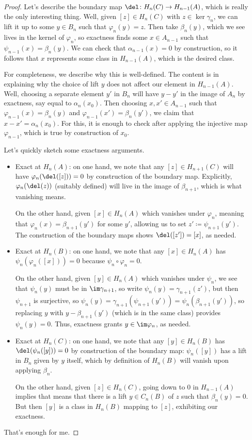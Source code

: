 \documentclass[../notes.tex]{subfiles}
\begin{document}
\begin{proof}
	Let's describe the boundary map $\del\colon H_n(C)\to H_{n-1}(A)$, which is really the only interesting thing. Well, given $[z]\in H_n(C)$ with $z\in\ker\gamma_n$, we can lift it up to some $y\in B_n$ such that $\varphi_n(y)=z$. Then take $\beta_n(y)$, which we see lives in the kernel of $\varphi_n$, so exactness finds some $x\in A_{n-1}$ such that $\psi_{n-1}(x)=\beta_n(y)$. We can check that $\alpha_{n-1}(x)=0$ by construction, so it follows that $x$ represents some class in $H_{n-1}(A)$, which is the desired class.

	For completeness, we describe why this is well-defined. The content is in explaining why the choice of lift $y$ does not affect our element in $H_{n-1}(A)$. Well, choosing a separate element $y'$ in $B_n$ will have $y-y'$ in the image of $A_n$ by exactness, say equal to $\alpha_n(x_0)$. Then choosing $x,x'\in A_{n-1}$ such that $\varphi_{n-1}(x)=\beta_n(y)$ and $\varphi_{n-1}(x')=\beta_n(y')$, we claim that $x-x'=\alpha_n(x_0)$. For this, it is enough to check after applying the injective map $\varphi_{n-1}$, which is true by construction of $x_0$.

	Let's quickly sketch some exactness arguments.
	\begin{itemize}
		\item Exact at $H_n(A)$: on one hand, we note that any $[z]\in H_{n+1}(C)$ will have $\varphi_n(\del([z]))=0$ by construction of the boundary map. Explicitly, $\varphi_n(\del(z))$ (suitably defined) will live in the image of $\beta_{n+1}$, which is what vanishing means.
		
		On the other hand, given $[x]\in H_n(A)$ which vanishes under $\varphi_n$, meaning that $\varphi_n(x)=\beta_{n+1}(y')$ for some $y'$, allowing us to set $z'\coloneqq\psi_{n+1}(y')$. The construction of the boundary maps shows $\del([z'])=[x]$, as needed.

		\item Exact at $H_n(B)$: on one hand, we note that any $[x]\in H_n(A)$ has $\psi_n(\varphi_n([x]))=0$ because $\psi_n\circ\varphi_n=0$.
		
		On the other hand, given $[y]\in H_n(A)$ which vanishes under $\psi_n$, we see that $\psi_n(y)$ must be in $\im\gamma_{n+1}$, so write $\psi_n(y)=\gamma_{n+1}(z')$, but then $\psi_{n+1}$ is surjective, so $\psi_n(y)=\gamma_{n+1}(\psi_{n+1}(y'))=\psi_n(\beta_{n+1}(y'))$, so replacing $y$ with $y-\beta_{n+1}(y')$ (which is in the same class) provides $\psi_n(y)=0$. Thus, exactness grants $y\in\im\varphi_n$, as needed.

		\item Exact at $H_n(C)$: on one hand, we note that any $[y]\in H_n(B)$ has $\del(\psi_n([y]))=0$ by construction of the boundary map: $\psi_n([y])$ has a lift in $B_n$ given by $y$ itself, which by definition of $H_n(B)$ will vanish upon applying $\beta_n$.
		
		On the other hand, given $[z]\in H_n(C)$, going down to $0$ in $H_{n-1}(A)$ implies that means that there is a lift $y\in C_n(B)$ of $z$ such that $\beta_n(y)=0$. But then $[y]$ is a class in $H_n(B)$ mapping to $[z]$, exhibiting our exactness.
	\end{itemize}
	That's enough for me.
\end{proof}
\end{document}
